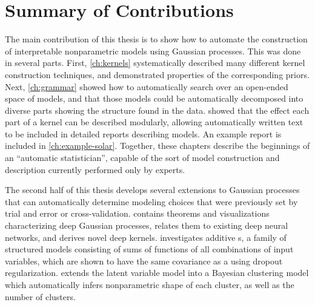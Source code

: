 \section{Summary of Contributions}

The main contribution of this thesis is to show how to automate the construction of interpretable nonparametric models using Gaussian processes.
This was done in several parts.
First, \cref{ch:kernels} systematically described many different kernel construction techniques, and demonstrated properties of the corresponding \gp{} priors.
Next, \cref{ch:grammar} showed how to automatically search over an open-ended space of \gp{} models, and that those models could be automatically decomposed into diverse parts showing the structure found in the data.
 showed that the effect each part of a kernel can be described modularly, allowing automatically written text to be included in detailed reports describing \gp{} models.
An example report is included in \cref{ch:example-solar}.
Together, these chapters describe the beginnings of an ``automatic statistician'', capable of the sort of model construction and description currently performed only by experts.

The second half of this thesis develops several extensions to Gaussian processes that can automatically determine modeling choices that were previously set by trial and error or cross-validation.
 contains theorems and visualizations characterizing deep Gaussian processes, relates them to existing deep neural networks, and derives novel deep kernels.
 investigates additive \gp{}s, a family of structured models consisting of sums of functions of all combinations of input variables, which are shown to have the same covariance as a \gp{} using dropout regularization.
 extends the \gp{} latent variable model into a Bayesian clustering model which automatically infers nonparametric shape of each cluster, as well as the number of clusters.






